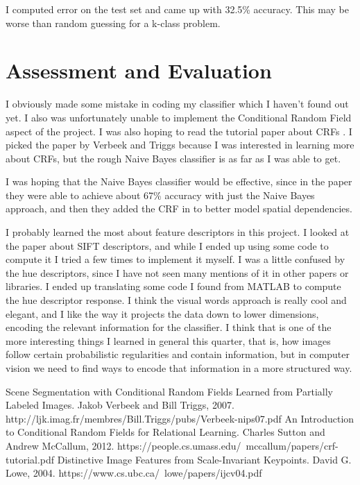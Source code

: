 \documentclass{article}
\begin{document}
I computed error on the test set and came up with 32.5\% accuracy. This may be worse than random guessing for a k-class problem.

\section{Assessment and Evaluation}

I obviously made some mistake in coding my classifier which I haven't found out yet. I also was unfortunately unable to implement the Conditional Random Field aspect of the project. I was also hoping to read the tutorial paper about CRFs \cite{CRF}. I picked the paper by Verbeek and Triggs because I was interested in learning more about CRFs, but the rough Naive Bayes classifier is as far as I was able to get. 

I was hoping that the Naive Bayes classifier would be effective, since in the paper they were able to achieve about 67\% accuracy with just the Naive Bayes approach, and then they added the CRF in to better model spatial dependencies. 

I probably learned the most about feature descriptors in this project. I looked at the paper about SIFT descriptors, and while I ended up using some code to compute it I tried a few times to implement it myself. I was a little confused by the hue descriptors, since I have not seen many mentions of it in other papers or libraries. I ended up translating some code I found from MATLAB to compute the hue descriptor response. I think the visual words approach is really cool and elegant, and I like the way it projects the data down to lower dimensions, encoding the relevant information for the classifier. I think that is one of the more interesting things I learned in general this quarter, that is, how images follow certain probabilistic regularities and contain information, but in computer vision we need to find ways to encode that information in a more structured way.

\begin{thebibliography}{widest entry}
  Scene Segmentation with Conditional Random Fields Learned from Partially Labeled Images. Jakob Verbeek and Bill Triggs, 2007. http://ljk.imag.fr/membres/Bill.Triggs/pubs/Verbeek-nips07.pdf
  An Introduction to Conditional Random
Fields for Relational Learning. Charles Sutton and Andrew McCallum, 2012. https://people.cs.umass.edu/~mccallum/papers/crf-tutorial.pdf
 Distinctive Image Features
from Scale-Invariant Keypoints. David G. Lowe, 2004.  https://www.cs.ubc.ca/~lowe/papers/ijcv04.pdf
\end{thebibliography}
\end{document}
